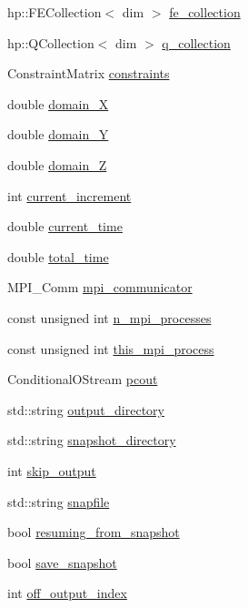 \begin{DoxyCompactItemize}
\item 
hp\+::\+F\+E\+Collection$<$ dim $>$ \mbox{\hyperlink{classinit_bound_val_probs_a02ae472de2833f8763bfe10520be87db}{fe\+\_\+collection}}
\item 
hp\+::\+Q\+Collection$<$ dim $>$ \mbox{\hyperlink{classinit_bound_val_probs_a748ffdb78a6294cd525fe5979bb30649}{q\+\_\+collection}}
\item 
Constraint\+Matrix \mbox{\hyperlink{classinit_bound_val_probs_aa08dcec4445eed1687b99cdb7b24b785}{constraints}}
\item 
double \mbox{\hyperlink{classinit_bound_val_probs_a9db8ce20b0de349987441b8d6830c97a}{domain\+\_\+X}}
\item 
double \mbox{\hyperlink{classinit_bound_val_probs_ae7a91557a809cfab5c3dee32ae1de8cb}{domain\+\_\+Y}}
\item 
double \mbox{\hyperlink{classinit_bound_val_probs_a199da42cf8a8e51eaeb5cacfdef1c37e}{domain\+\_\+Z}}
\item 
int \mbox{\hyperlink{classinit_bound_val_probs_a9a75da991ed1d29646660b1d16a0418f}{current\+\_\+increment}}
\item 
double \mbox{\hyperlink{classinit_bound_val_probs_a557717b333342f1e34a905d6162ce493}{current\+\_\+time}}
\item 
double \mbox{\hyperlink{classinit_bound_val_probs_abc276e47b85df9dd59f248e663b3b971}{total\+\_\+time}}
\item 
M\+P\+I\+\_\+\+Comm \mbox{\hyperlink{classinit_bound_val_probs_a03728ed636ca889ae407c84d181bc611}{mpi\+\_\+communicator}}
\item 
const unsigned int \mbox{\hyperlink{classinit_bound_val_probs_a7320777b83fedaf7a54cdb2fb0ef02e4}{n\+\_\+mpi\+\_\+processes}}
\item 
const unsigned int \mbox{\hyperlink{classinit_bound_val_probs_a6c34addfd3b89faf0a7b4e3fe1236fb0}{this\+\_\+mpi\+\_\+process}}
\item 
Conditional\+O\+Stream \mbox{\hyperlink{classinit_bound_val_probs_a914f651bc9ca2e223b243695dd37ba53}{pcout}}
\item 
std\+::string \mbox{\hyperlink{classinit_bound_val_probs_a95f0e6f488a1faae487cab4198842ebe}{output\+\_\+directory}}
\item 
std\+::string \mbox{\hyperlink{classinit_bound_val_probs_af7ed49a5ea9a6407acb26c5a729d4bd0}{snapshot\+\_\+directory}}
\item 
int \mbox{\hyperlink{classinit_bound_val_probs_a5413329bd1d73152f051cc8d11134f60}{skip\+\_\+output}}
\item 
std\+::string \mbox{\hyperlink{classinit_bound_val_probs_a3ce0cf43eef10e4757e8a225e9b98e96}{snapfile}}
\item 
bool \mbox{\hyperlink{classinit_bound_val_probs_a34ea26077a33f792a9468a4d0ac2feaf}{resuming\+\_\+from\+\_\+snapshot}}
\item 
bool \mbox{\hyperlink{classinit_bound_val_probs_ade455df689de2bc3fb79e1f468fd5404}{save\+\_\+snapshot}}
\item 
int \mbox{\hyperlink{classinit_bound_val_probs_a5b4ed019aaae8f2992f9418a93cd1dbb}{off\+\_\+output\+\_\+index}}
\end{DoxyCompactItemize}



